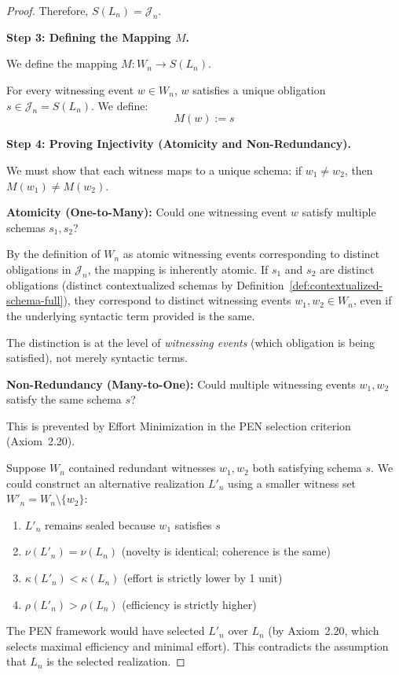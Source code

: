 \documentclass[11pt]{article}
\theoremstyle{definition}
\theoremstyle{remark}
\begin{document}
\begin{proof}
Therefore, $S(L_n) = \mathcal{J}_n$.

\textbf{Step 3: Defining the Mapping $M$.}

We define the mapping $M: W_n \to S(L_n)$.

For every witnessing event $w \in W_n$, $w$ satisfies a unique obligation $s \in \mathcal{J}_n = S(L_n)$. We
define:
\[
M(w) := s
\]

\textbf{Step 4: Proving Injectivity (Atomicity and Non-Redundancy).}

We must show that each witness maps to a unique schema: if $w_1 \neq w_2$, then $M(w_1) \neq M(w_2)$.

\textbf{Atomicity (One-to-Many):} Could one witnessing event $w$ satisfy multiple schemas $s_1, s_2$?

By the definition of $W_n$ as atomic witnessing events corresponding to distinct obligations in $\mathcal{J}_n$,
the mapping is inherently atomic. If $s_1$ and $s_2$ are distinct obligations (distinct contextualized
schemas by Definition~\ref{def:contextualized-schema-full}), they correspond to distinct witnessing
events $w_1, w_2 \in W_n$, even if the underlying syntactic term provided is the same.

The distinction is at the level of \emph{witnessing events} (which obligation is being satisfied), not
merely syntactic terms.

\textbf{Non-Redundancy (Many-to-One):} Could multiple witnessing events $w_1, w_2$ satisfy the same
schema $s$?

This is prevented by Effort Minimization in the PEN selection criterion (Axiom~2.20).

Suppose $W_n$ contained redundant witnesses $w_1, w_2$ both satisfying schema $s$. We could construct
an alternative realization $L'_n$ using a smaller witness set $W'_n = W_n \setminus \{w_2\}$:

\begin{enumerate}
\item $L'_n$ remains sealed because $w_1$ satisfies $s$
\item $\nu(L'_n) = \nu(L_n)$ (novelty is identical; coherence is the same)
\item $\kappa(L'_n) < \kappa(L_n)$ (effort is strictly lower by 1 unit)
\item $\rho(L'_n) > \rho(L_n)$ (efficiency is strictly higher)
\end{enumerate}

The PEN framework would have selected $L'_n$ over $L_n$ (by Axiom~2.20, which selects maximal
efficiency and minimal effort). This contradicts the assumption that $L_n$ is the selected realization.


\end{proof}
\end{document}

